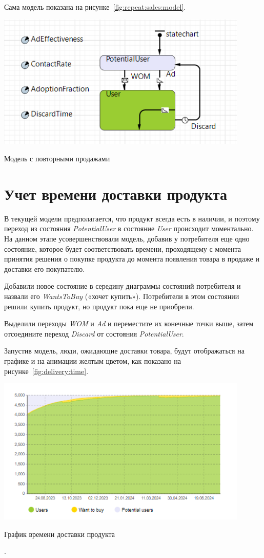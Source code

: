 Сама модель показана на рисунке~\ref{fig:repeat:sales:model}.

\begin{image}
	\includegraphics[width=0.9\textwidth]{2023-03-28_17-20-26}
	\caption{Модель с повторными продажами}
	\label{fig:repeat:sales:model}
\end{image}

\section{Учет времени доставки продукта}
В текущей модели предполагается, что продукт всегда есть в наличии, и
поэтому переход из состояния \textit{PotentialUser} в состояние
\textit{User} происходит моментально. На данном этапе усовершенствовали
модель, добавив у потребителя еще одно состояние, которое будет
соответствовать времени, проходящему с момента принятия решения о покупке
продукта до момента появления товара в продаже и доставки его покупателю.\par
Добавили новое состояние в середину диаграммы состояний потребителя
и назвали его \textit{WantsToBuy} («хочет купить»). Потребители в этом
состоянии решили купить продукт, но продукт пока еще не приобрели.\par
Выделили переходы \textit{WOM} и \textit{Ad} и переместите их конечные
точки выше, затем отсоедините переход \textit{Discard} от состояния
\textit{PotentialUser}.\par
Запустив модель, люди, ожидающие доставки товара, будут отображаться
на графике и на анимации желтым цветом, как
показано на рисунке~\ref{fig:delivery:time}.

\begin{image}
	\includegraphics[width=0.9\textwidth]{2023-03-28_17-33-21}
	\caption{График времени доставки продукта}
	\label{fig:delivery:time}.
\end{image}

